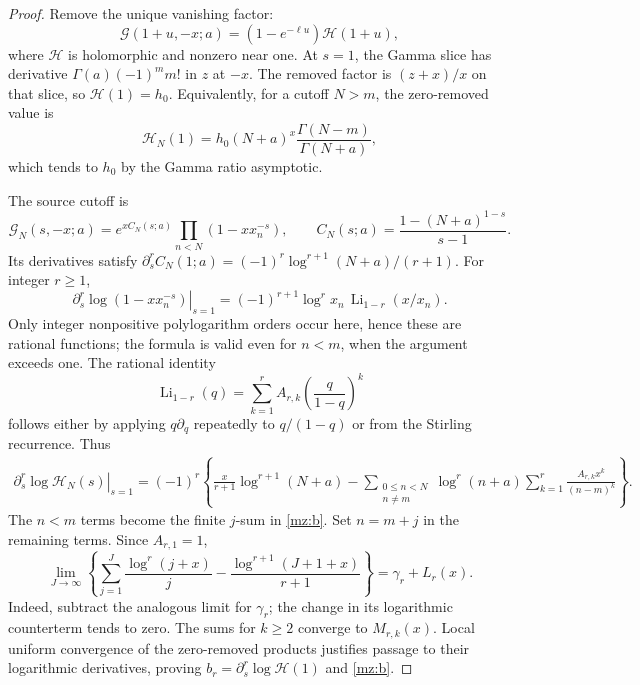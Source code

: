 \begin{proof}
Remove the unique vanishing factor:
\[
 \mathcal G(1+u,-x;a)=(1-e^{-\ell u})\mathcal H(1+u),
\]
where $\mathcal H$ is holomorphic and nonzero near one. At $s=1$, the
Gamma slice has derivative $\Gamma(a)(-1)^m m!$ in $z$ at $-x$.
The removed factor is $(z+x)/x$ on that slice, so $\mathcal H(1)=h_0$.
Equivalently, for a cutoff $N>m$, the zero-removed value is
\begin{equation}
 \mathcal H_N(1)=h_0 (N+a)^x
                      \frac{\Gamma(N-m)}{\Gamma(N+a)},
 \label{mz:Hcut}
\end{equation}
which tends to $h_0$ by the Gamma ratio asymptotic.

The source cutoff is
\[
 \mathcal G_N(s,-x;a)
   =e^{xC_N(s;a)}\prod_{n<N}(1-xx_n^{-s}),\qquad
 C_N(s;a)=\frac{1-(N+a)^{1-s}}{s-1}.
\]
Its derivatives satisfy
$\partial_s^r C_N(1;a)=(-1)^r\log^{r+1}(N+a)/(r+1)$.
For integer $r\ge1$,
\begin{equation}
 \left.\partial_s^r\log(1-xx_n^{-s})\right|_{s=1}
       =(-1)^{r+1}\log^r x_n\,
                         \operatorname{Li}_{1-r}(x/x_n).
 \label{mz:LiDerivative}
\end{equation}
Only integer nonpositive polylogarithm orders occur here, hence these are
rational functions; the formula is valid even for $n<m$, when the
argument exceeds one. The rational identity
\begin{equation}
 \operatorname{Li}_{1-r}(q)
       =\sum_{k=1}^{r}A_{r,k}\left(\frac q{1-q}\right)^k
 \label{mz:LiStirling}
\end{equation}
follows either by applying $q\partial_q$ repeatedly to $q/(1-q)$ or
from the Stirling recurrence. Thus
\begin{align}
 \left.\partial_s^r\log\mathcal H_N(s)\right|_{s=1}
 =(-1)^r\left\{\frac{x}{r+1}\log^{r+1}(N+a)
  -\sum_{\substack{0\le n<N\\n\ne m}}\log^r(n+a)
          \sum_{k=1}^{r}\frac{A_{r,k}x^k}{(n-m)^k}\right\}.
 \label{mz:bcut}
\end{align}
The $n<m$ terms become the finite $j$-sum in \eqref{mz:b}. Set $n=m+j$
in the remaining terms. Since $A_{r,1}=1$,
\[
 \lim_{J\to\infty}\left\{
   \sum_{j=1}^{J}\frac{\log^r(j+x)}j
       -\frac{\log^{r+1}(J+1+x)}{r+1}\right\}
       =\gamma_r+L_r(x).
\]
Indeed, subtract the analogous limit for $\gamma_r$; the change in its
logarithmic counterterm tends to zero. The sums for $k\ge2$ converge to
$M_{r,k}(x)$. Local uniform convergence of the zero-removed products
justifies passage to their logarithmic derivatives, proving
$b_r=\partial_s^r\log\mathcal H(1)$ and \eqref{mz:b}.


\end{proof}
